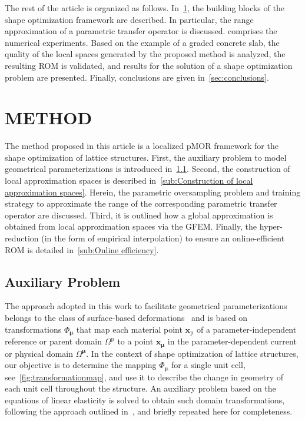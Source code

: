 \documentclass[a4paper]{eccomas_paper-2024}
\begin{document}
The rest of the article is organized as follows.
In~\cref{sec:method}, the building blocks of the shape optimization framework are described.
In particular, the range approximation of a parametric transfer operator is discussed.
 comprises the numerical experiments.
Based on the example of a graded concrete slab, the quality of the local spaces generated by the proposed method is analyzed, the resulting ROM is validated, and results for the solution of a shape optimization problem are presented.
Finally, conclusions are given in~\cref{sec:conclusions}.



\section{METHOD}%
\label{sec:method}
The method proposed in this article is a localized pMOR framework for the shape optimization of lattice structures.
First, the auxiliary problem to model geometrical parameterizations is introduced in~\cref{sub:Auxiliary Problem}.
Second, the construction of local approximation spaces is described in~\cref{sub:Construction of local approximation spaces}.
Herein, the parametric oversampling problem and training strategy to approximate the range of the corresponding parametric transfer operator are discussed.
Third, it is outlined how a global approximation is obtained from local approximation spaces via the GFEM.
Finally, the hyper-reduction (in the form of empirical interpolation) to ensure an online-efficient ROM is detailed in~\cref{sub:Online efficiency}.

\subsection{Auxiliary Problem} %
\label{sub:Auxiliary Problem}
The approach adopted in this work to facilitate geometrical parameterizations belongs to the class of surface-based deformations~\cite{Botsch2010Polygon} and is based on transformations $\Phi_{\bm\mu}$ that map each material point $\bm{x}_{\mathrm{p}}$ of a parameter-independent reference or parent domain $\varOmega^{\mathrm{p}}$ to a point $\bm{x}_{\bm\mu}$ in the parameter-dependent current or physical domain $\varOmega^{\bm\mu}$.
In the context of shape optimization of lattice structures, our objective is to determine the mapping $\Phi_{\bm\mu}$ for a single unit cell, see~\cref{fig:transformationmap}, and use it to describe the change in geometry of each unit cell throughout the structure.
An auxiliary problem based on the equations of linear elasticity is solved to obtain such domain transformations, following the approach outlined in~\cite{Guo2022Learning}, and briefly repeated here for completeness.
\end{document}
